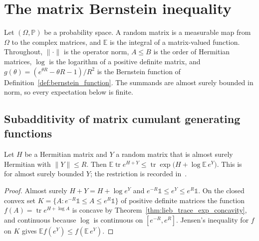 \section{The matrix Bernstein inequality}
\label{sec:matrix_bernstein}


Let $(\Omega,\mathbb{P})$ be a probability space. A random matrix is a
measurable map from $\Omega$ to the complex matrices, and $\mathbb{E}$ is the
integral of a matrix-valued function. Throughout, $\|\cdot\|$ is the operator
norm, $A\le B$ is the order of Hermitian matrices, $\log$ is the logarithm of a
positive definite matrix, and $g(\theta)=(e^{\theta R}-\theta R-1)/R^{2}$ is the
Bernstein function of Definition~\ref{def:bernstein_function}. The summands are
almost surely bounded in norm, so every expectation below is finite.

\subsection{Subadditivity of matrix cumulant generating functions}

\begin{theorem}
    \label{thm:matrix_cgf_jensen}
    \leanok
    Let $H$ be a Hermitian matrix and $Y$ a random matrix that is almost surely
    Hermitian with $\|Y\|\le R$. Then
    $\mathbb{E}\operatorname{tr}e^{H+Y}\le\operatorname{tr}\exp\bigl(H+\log\mathbb{E}\,e^{Y}\bigr)$.
    This is~\cite[Corollary~3.3]{Tropp2012User} for almost surely bounded $Y$;
    the restriction is recorded in~\cite{gap:tropp12_bounded_summands_scope}.
\end{theorem}
\begin{proof}\leanok
    Almost surely $H+Y=H+\log e^{Y}$
    and $e^{-R}\mathbb{1}\le e^{Y}\le e^{R}\mathbb{1}$. On the closed convex set
    $K=\{A:e^{-R}\mathbb{1}\le A\le e^{R}\mathbb{1}\}$ of positive definite
    matrices the function $f(A)=\operatorname{tr}e^{H+\log A}$ is concave by
    Theorem~\ref{thm:lieb_trace_exp_concavity}, and continuous because $\log$ is
    continuous on $[e^{-R},e^{R}]$. Jensen's inequality for $f$ on $K$ gives
    $\mathbb{E}f(e^{Y})\le f(\mathbb{E}\,e^{Y})$.
\end{proof}

